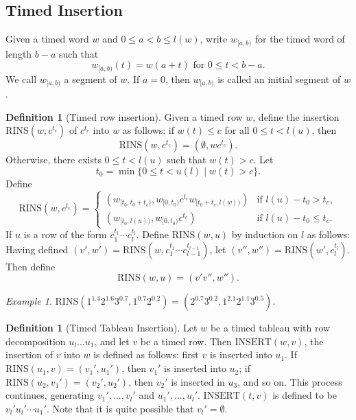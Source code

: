 \documentclass[10pt]{amsproc}
\theoremstyle{definition}
\newtheorem{definition}[theorem]{Definition}
\theoremstyle{remark}
\newtheorem{example}[theorem]{Example}
\newcommand{\rowins}{\mathrm{RINS}}
\newcommand{\ins}{\mathrm{INSERT}}
\begin{document}
\subsection{Timed Insertion}
\label{sec:timed-insertion}
Given a timed word $w$ and $0\leq a < b \leq l(w)$, write $w_{[a, b)}$ for the timed word of length $b-a$ such that
\begin{displaymath}
  w_{[a, b)}(t) = w(a+ t) \text{ for } 0\leq t<b-a.
\end{displaymath}
We call $w_{[a,b)}$ a segment of $w$.
If $a=0$, then $w_{[a,b)}$ is called an initial segment of $w$.
\begin{definition}[Timed row insertion]
  \label{definition:timed-row-insertion}
  Given a timed row $w$, define the insertion $\rowins(w, c^{t_c})$ of $c^{t_c}$ into $w$ as follows: if $w(t)\leq c$ for all $0\leq t < l(u)$, then
  \begin{displaymath}
    \rowins(w, c^{t_c}) = (\emptyset, wc^{t_c}).
  \end{displaymath}
  Otherwise, there exists $0\leq t < l(u)$ such that $w(t)>c$.
  Let
  \begin{displaymath}
    t_0 = \min\{0\leq t< u(l)\mid w(t)> c\}.
  \end{displaymath}
  Define
  \begin{displaymath}
    \rowins(w, c^{t_c}) =
    \begin{cases}
      (w_{[t_0, t_0+t_c)}, w_{[0, t_0)}c^{t_c} w_{[t_0+t_c, l(w))}) & \text{if } l(u) - t_0 > t_c,\\
      (w_{[t_0, l(u))}, w_{[0, t_0)} c^{t_c}) & \text{if } l(u) - t_0 \leq t_c.
    \end{cases}
  \end{displaymath}
  If $u$ is a row of the form $c_1^{t_1}\dotsb c_l^{t_l}$.
  Define $\rowins(w,u)$ by induction on $l$ as follows:
  Having defined $(v',w')=\rowins(w,c_1^{t_1}\dotsb c_{l-1}^{t_{l-1}})$,
  let $(v'',w'')=\rowins(w',c_l^{t_l})$.
  Then define
  \begin{displaymath}
    \rowins(w,u) = (v'v'', w'').
  \end{displaymath}
\end{definition}
\begin{example}
  \label{example:timed-row-ins}
  $\rowins(1^{1.4}2^{1.6}3^{0.7},1^{0.7}2^{0.2})=(2^{0.7}3^{0.2},1^{2.1}2^{1.1}3^{0.5})$.
\end{example}
\begin{definition}
  [Timed Tableau Insertion]
  Let $w$ be a timed tableau with row decomposition $u_l\dotsc u_1$, and let $v$ be a timed row.
  Then $\ins(w, v)$, the insertion of $v$ into $w$ is defined as follows:
  first $v$ is inserted into $u_1$.
  If $\rowins(u_1,v)=(v_1',u_1')$, then $v_1'$ is inserted into $u_2$; if $\rowins(u_2,v_1')=(v_2',u_2')$, then $v_2'$ is inserted in $u_3$, and so on.
  This process continues, generating $v_1',\dotsc,v_l'$ and $u_1',\dotsc,u_l'$.
  $\ins(t,v)$ is defined to be $v_l'u_l'\dotsb u_1'$.
  Note that it is quite possible that $v_l'=\emptyset$.
\end{definition}
\end{document}
